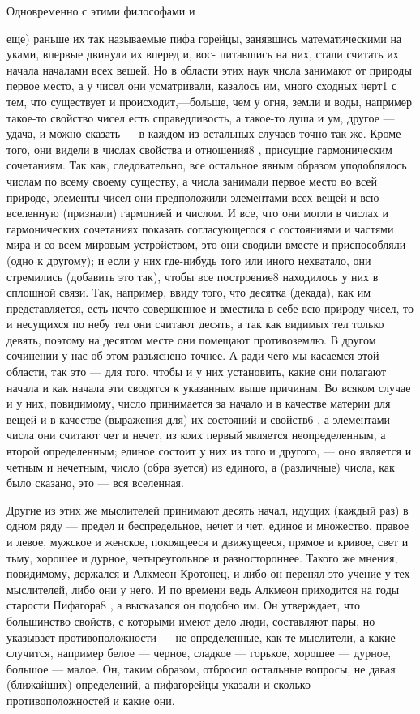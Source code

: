 \documentclass{article}
\begin{document}
Одновременно с этими философами и {еще) раньше их так называемые пифа горейцы, занявшись математическими на уками, впервые двинули их вперед и, вос- питавшись на них, стали считать их начала  началами всех вещей. Но в области этих  наук числа занимают от природы первое место, а у чисел они усматривали, казалось им, много сходных черт1  с тем, что существует и происходит,—больше, чем у огня, земли и воды, например такое-то свойство чисел есть справедливость, а такое-то душа и ум, другое — удача, и можно сказать — в каждом из остальных случаев точно так же. Кроме того, они видели в числах свойства и отношения8 , присущие гармоническим сочетаниям. Так как, следовательно, все остальное явным образом уподоблялось числам по всему своему существу, а числа занимали первое место во всей природе, элементы чисел они предположили элементами всех вещей и всю вселенную (признали) гармонией и числом. И все, что они могли в числах и гармонических сочетаниях показать согласующегося с состояниями и частями мира и со всем мировым устройством, это они сводили вместе и приспособляли (одно к другому); и если у них где-нибудь того или иного нехватало, они стремились (добавить это так), чтобы все построение8  находилось у них в сплошной связи. Так, например, ввиду того, что десятка (декада), как им представляется, есть нечто совершенное и вместила в себе всю природу чисел, то и несущихся по небу тел они считают десять, а так как видимых тел только девять, поэтому на десятом месте они помещают противоземлю.
\footnotemark[1]
В другом сочинении у нас об этом разъяснено точнее.
\footnotemark[2]
А ради чего мы касаемся этой области, так это — для того, чтобы и у них установить, какие они полагают начала и как начала эти сводятся к указанным выше причинам. Во всяком случае и у них, повидимому, число принимается за начало и в качестве материи для вещей и в качестве (выражения для) их состояний и свойств6 , а элементами числа они считают чет и нечет, из коих первый является неопределенным, а второй определенным; единое состоит у них из того и другого, — оно является и четным и нечетным, число (обра зуется) из единого, а (различные) числа, как было сказано, это — вся вселенная.

Другие из этих же мыслителей принимают десять начал, идущих (каждый раз) в одном ряду — предел и беспредельное, нечет и чет, единое и множество, правое и левое, мужское и женское, покоящееся и движущееся, прямое и кривое, свет и тьму, хорошее и дурное, четыреугольное и разностороннее.
\footnotemark[3]
Такого же мнения, повидимому, держался и Алкмеон Кротонец,
\footnotemark[4]
и либо он перенял это учение у тех мыслителей, либо они у него. И по времени ведь Алкмеон приходится на годы старости Пифагора8 , а высказался он подобно им. Он утверждает, что большинство свойств, с которыми имеют дело люди, составляют пары, но указывает противоположности — не определенные, как те мыслители, а какие случится, например белое — черное, сладкое — горькое, хорошее — дурное, большое — малое. Он, таким образом, отбросил остальные вопросы, не давая (ближайших) определений, а пифагорейцы указали и сколько противоположностей и какие они.

}
\end{document}
